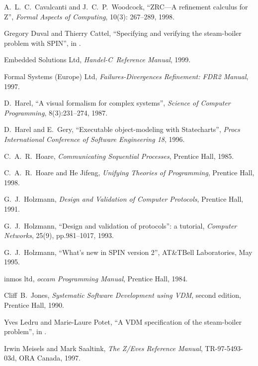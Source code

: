 \documentclass{report}
\newcommand{\HandelC}{\textsf{\slshape Handel-C}}
\begin{document}
\begin{thebibliography}{XX}
 A.~L.~C.~Cavalcanti and
  J.~C.~P.~Woodcock, ``ZRC---A refinement calculus for Z'',
  \textsl{Formal Aspects of Computing}, 10(3): 267--289, 1998.

 Gregory Duval and Thierry Cattel,
  ``Specifying and verifying the steam-boiler problem with SPIN'', in
  \cite[pp.203--217]{abrial-borger-langmaack-96}.

 Embedded Solutions Ltd,
  \emph{\HandelC\ Reference Manual}, 1999.

 Formal Systems (Europe) Ltd,
  \emph{Failures-Divergences Refinement: FDR2 Manual}, 1997.

 D.~Harel, ``A visual formalism for complex
  systems'', \emph{Science of Computer Programming}, 8(3):231--274,
  1987.

 D.~Harel and E.~Gery, ``Executable
  object-modeling with Statecharts'', \emph{Procs International
  Conference of Software Engineering 18}, 1996.

 C.~A.~R.~Hoare, \emph{Communicating Sequential
    Processes}, Prentice Hall, 1985.

 C.~A.~R.~Hoare and He Jifeng, \emph{Unifying
    Theories of Programming}, Prentice Hall, 1998.

 G.~J.~Holzmann, \emph{Design and Validation of
    Computer Protocols}, Prentice Hall, 1991.

 G.~J.~Holzmann, ``Design and validation of
  protocols'': a tutorial, \emph{Computer Networks}, 25(9),
  pp.981--1017, 1993.

 G.~J.~Holzmann, ``What's new in SPIN version
  2'', AT\&TBell Laboratories, May 1995.

 \textsf{inmos ltd}, \emph{\textsf{occam}
    Programming Manual}, Prentice Hall, 1984.

 Cliff~B.~Jones, \emph{Systematic Software
    Development using VDM}, second edition, Prentice Hall, 1990.

 Yves Ledru and Marie-Laure Potet, ``A VDM
  specification of the steam-boiler problem'', in
  \cite[pp.283--317]{abrial-borger-langmaack-96}.

 Irwin Meisels and Mark Saaltink,
  \emph{The Z/Eves Reference Manual}, TR-97-5493-03d, ORA Canada,
  1997.


\end{thebibliography}
\end{document}
